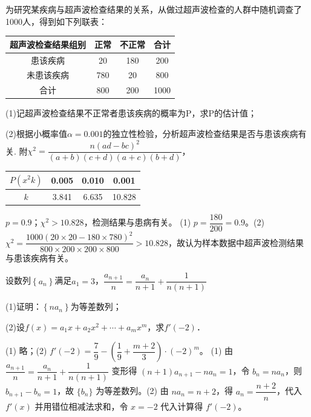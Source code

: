 \documentclass[12pt,a4paper]{article}%
\begin{document}

\begin{question}
为研究某疾病与超声波检查结果的关系，从做过超声波检查的人群中随机调查了1000人，得到如下列联表：

\begin{center}
\begin{tabular}{|c|c|c|c|}
\hline
超声波检查结果组别 & 正常 & 不正常 & 合计 \\ \hline
患该疾病 & 20 & 180 & 200 \\ \hline
未患该疾病 & 780 & 20 & 800 \\ \hline
合计 & 800 & 200 & 1000 \\ \hline
\end{tabular}
\end{center}

(1)记超声波检查结果不正常者患该疾病的概率为P，求P的估计值；

(2)根据小概率值$\alpha =0.001$的独立性检验，分析超声波检查结果是否与患该疾病有关.
附$\chi^2=\dfrac{n(a d-b c)^2}{(a+b)(c+d)(a+c)(b+d)}$，

\begin{center}
\begin{tabular}{|c|c|c|c|}
\hline
$P\left( x^2k \right)$ & 0.005 & 0.010 & 0.001 \\ \hline
$k$ & 3.841 & 6.635 & 10.828 \\ \hline
\end{tabular}
\end{center}

\end{question}

\solutionSpace{6cm}
\begin{answer}{$p=0.9$；$\chi^2>10.828$，检测结果与患病有关。}
(1) $p=\dfrac{180}{200}=0.9$。(2) $\chi^2=\dfrac{1000(20\times20-180\times780)^2}{800\times200\times200\times800}>10.828$，故认为样本数据中超声波检测结果与患该疾病有关。
\end{answer}

\begin{question}
设数列$\left\{ a_n \right\}$满足$a_1=3$，$\dfrac{a_{n+1}}{n}=\dfrac{a_n}{n+1}+\dfrac{1}{n(n+1)}$

(1)证明：$\left\{ na_n \right\}$为等差数列；

(2)设$f(x)=a_1x+a_2x^2+\cdots +a_mx^m$，求$f'(-2)$．

\end{question}
\solutionSpace{5cm}
\begin{answer}{(1) 略；(2) $f'(-2)=\dfrac{7}{9}-\left(\dfrac{1}{9}+\dfrac{m+2}{3}\right)\cdot(-2)^m$。}
(1) 由 $\dfrac{a_{n+1}}{n}=\dfrac{a_n}{n+1}+\dfrac{1}{n(n+1)}$ 变形得 $(n+1)a_{n+1}-na_n=1$，令 $b_n=na_n$，则 $b_{n+1}-b_n=1$，故 $\{b_n\}$ 为等差数列。(2) 由 $na_n=n+2$，得 $a_n=\dfrac{n+2}{n}$，代入 $f'(x)$ 并用错位相减法求和，令 $x=-2$ 代入计算得 $f'(-2)$。
\end{answer}
\end{document}
